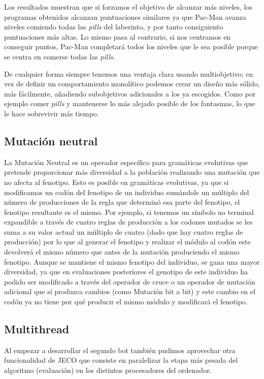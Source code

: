 Los resultados muestran que si forzamos el objetivo de alcanzar más niveles, los programas obtenidos alcanzan puntuaciones similares ya que Pac-Man avanza niveles comiendo todas las \textit{pills} del laberinto, y por tanto consiguiento puntuaciones más altas. Lo mismo pasa al contrario, si nos centramos en conseguir puntos, Pac-Man completará todos los niveles que le sea posible porque se centra en comerse todas las \textit{pills}.
 
De cualquier forma siempre tenemos una ventaja clara usando multiobjetivo; en vez de definir un comportamiento monolítico podemos crear un diseño más sólido, más fácilmente, añadiendo subobjetivos adicionales a los ya escogidos. Como por ejemplo comer \textit{pills} y mantenerse lo más alejado posible de los fantasmas, lo que le hace sobrevivir más tiempo.

\subsection{Mutación neutral}
La Mutación Neutral es un operador específico para gramáticas evolutivas\cite{oesch2015neutral} que pretende proporcionar más diversidad a la población realizando una mutación que no afecta al fenotipo. Esto es posible en gramáticas evolutivas, ya que si modificamos un codón del fenotipo de un individuo sumándole un múltiplo del número de producciones de la regla que determinó esa parte del fenotipo, el fenotipo resultante es el mismo. Por ejemplo, si tenemos un símbolo no terminal expandible a través de cuatro reglas de producción a los codones mutados se les suma a su valor actual un múltiplo de cuatro (dado que hay cuatro reglas de producción) por lo que al generar el fenotipo y realizar el módulo al codón este devolverá el mismo número que antes de la mutación produciendo el mismo fenotipo.
Aunque se mantiene el mismo fenotipo del individuo, se gana una mayor diversidad, ya que en evaluaciones posteriores el genotipo de este individuo ha podido ser modificado a través del operador de cruce o un operador de mutación adicional que sí produzca cambios (como Mutación bit a bit) y este cambio en el codón ya no tiene por qué producir el mismo módulo y modificará el fenotipo.


\subsection{Multithread}
Al empezar a desarrollar el segundo bot también pudimos aprovechar otra funcionalidad de JECO que consiste en paralelizar la etapa más pesada del algoritmo (evaluación) en los distintos procesadores del ordenador.

